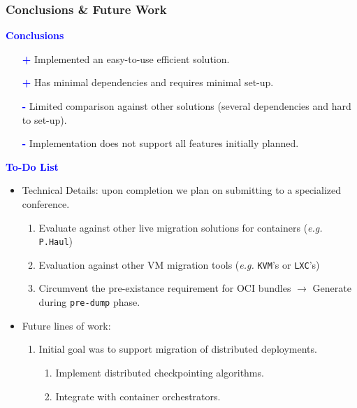 \documentclass[9pt,    %
    english,            %
    xcolor=table,       %
    envcountsect,        %
    aspectratio=169     %
]{beamer}
\begin{document}
\begin{frame}
    \frametitle{Conclusions \& Future Work}

    \textbf{\textcolor{blue}{Conclusions}}
    \begin{itemize}
        \item[\textcolor{blue}{\textbf{+}}] Implemented an easy-to-use efficient solution.
        \item[\textcolor{blue}{\textbf{+}}] Has minimal dependencies and requires minimal set-up.
        \item[\textcolor{blue}{\textbf{-}}] Limited comparison against other solutions (several dependencies and hard to set-up).
        \item[\textcolor{blue}{\textbf{-}}] Implementation does not support all features initially planned.
    \end{itemize}

    \vspace{10pt}

    \textbf{\textcolor{blue}{To-Do List}}
    \begin{itemize}
        \item Technical Details: upon completion we plan on submitting to a specialized conference.
        \begin{enumerate}
            \item Evaluate against other live migration solutions for containers (\textit{e.g.} \texttt{P.Haul})
            \item Evaluation against other VM migration tools (\textit{e.g.} \texttt{KVM}'s or \texttt{LXC}'s)
            \item Circumvent the pre-existance requirement for OCI bundles $\rightarrow$ Generate during \texttt{pre-dump} phase.
        \end{enumerate}
        \item Future lines of work:
        \begin{enumerate}
            \item Initial goal was to support migration of distributed deployments.
            \begin{enumerate}
                \item Implement distributed checkpointing algorithms.
                \item Integrate with container orchestrators.
            \end{enumerate}
        \end{enumerate}
    \end{itemize}

\end{frame}
\end{document}
